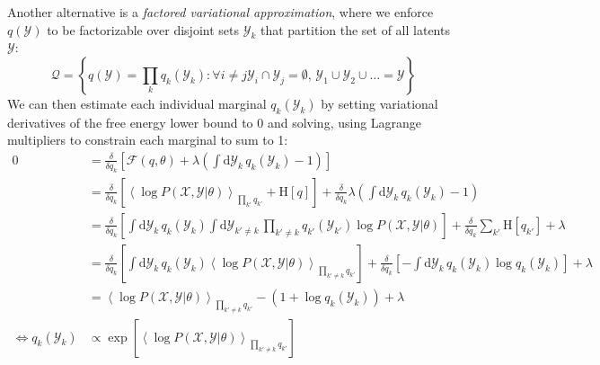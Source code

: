 \documentclass[a4paper]{article}
\begin{document}
Another alternative is a \emph{factored variational approximation}, where we enforce $q(\mathcal{Y})$ to be factorizable over disjoint sets $\mathcal{Y}_k$ that partition the set of all latents $\mathcal{Y}$:
\[ \mathcal{Q} = \left\{q(\mathcal{Y}) = \prod_k q_k(\mathcal{Y}_k): \forall i\neq j \mathcal{Y}_i \cap \mathcal{Y}_j = \emptyset,\, \mathcal{Y}_1\cup\mathcal{Y}_2\cup\ldots = \mathcal{Y}  \right\} \]
We can then estimate each individual marginal $q_k(\mathcal{Y}_k)$ by setting variational derivatives of the free energy lower bound to 0 and solving, using Lagrange multipliers to constrain each marginal to sum to 1:
\begin{align*}
0 &= \frac{\delta}{\delta q_k} \left[ \mathcal{F}(q,\theta) + \lambda\left(\int\textrm{d}\mathcal{Y}_k\, q_k(\mathcal{Y}_k) - 1\right) \right] \\
&= \frac{\delta}{\delta q_k} \left[ \left\langle \log P(\mathcal{X},\mathcal{Y}|\theta) \right\rangle_{\prod_{k'}q_{k'}} + \textrm{H}[q] \right] + \frac{\delta}{\delta q_k}\lambda\left(\int\textrm{d}\mathcal{Y}_k\, q_k(\mathcal{Y}_k) - 1\right) \\
&= \frac{\delta}{\delta q_k} \left[ \int\textrm{d}\mathcal{Y}_k\, q_k(\mathcal{Y}_k) \int\textrm{d}\mathcal{Y}_{k' \neq k}\, \prod_{k'\neq k} q_{k'}(\mathcal{Y}_{k'}) \log P(\mathcal{X},\mathcal{Y}|\theta) \right] + \frac{\delta}{\delta q_k} \sum_{k'} \textrm{H}[q_{k'}] + \lambda \\
&= \frac{\delta}{\delta q_k} \left[ \int\textrm{d}\mathcal{Y}_k\, q_k(\mathcal{Y}_k) \left\langle \log P(\mathcal{X},\mathcal{Y}|\theta) \right\rangle_{\prod_{k'\neq k}q_{k'}} \right] + \frac{\delta}{\delta q_k} \left[-\int\textrm{d}\mathcal{Y}_k\, q_k(\mathcal{Y}_k) \log q_k(\mathcal{Y}_k) \right] + \lambda \\
&= \left\langle \log P(\mathcal{X},\mathcal{Y}|\theta) \right\rangle_{\prod_{k'\neq k}q_{k'}} - \left(1 + \log q_k(\mathcal{Y}_k) \right) + \lambda \\
\Leftrightarrow q_k(\mathcal{Y}_k) &\propto \exp\left[ \left\langle \log P(\mathcal{X},\mathcal{Y}|\theta) \right\rangle_{\prod_{k'\neq k}q_{k'}} \right]
\end{align*}
\end{document}
